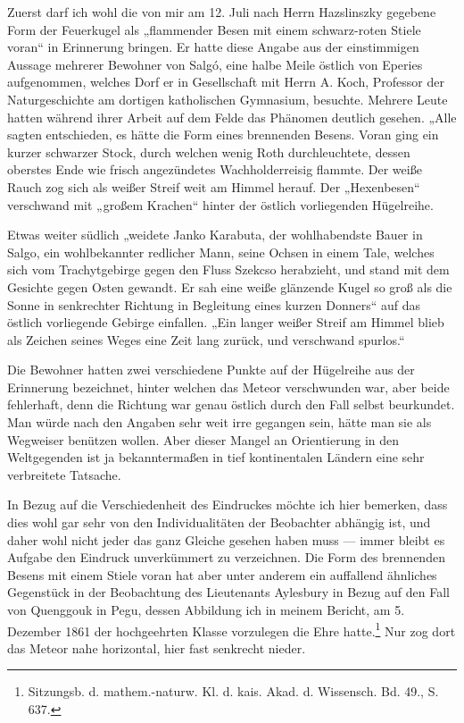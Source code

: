 \documentclass[a4paper, 11pt, oneside, german]{article}
\begin{document}
Zuerst darf ich wohl die von mir am 12. Juli nach Herrn Hazslinszky gegebene Form der Feuerkugel als „flammender Besen mit einem schwarz-roten Stiele voran“ in Erinnerung bringen. Er hatte diese Angabe aus der einstimmigen Aussage mehrerer Bewohner von Salgó, eine halbe Meile östlich von Eperies aufgenommen, welches Dorf er in Gesellschaft mit Herrn A. Koch, Professor der Naturgeschichte am dortigen katholischen Gymnasium, besuchte. Mehrere Leute hatten während ihrer Arbeit auf dem Felde das Phänomen deutlich gesehen. „Alle sagten entschieden, es hätte die Form eines brennenden Besens. Voran ging ein kurzer schwarzer Stock, durch welchen wenig Roth durchleuchtete, dessen oberstes Ende wie frisch angezündetes Wachholderreisig flammte. Der weiße Rauch zog sich als weißer Streif weit am Himmel herauf. Der „Hexenbesen“ verschwand mit „großem Krachen“ hinter der östlich vorliegenden Hügelreihe.

Etwas weiter südlich „weidete Janko Karabuta, der wohlhabendste Bauer in Salgo, ein wohlbekannter redlicher Mann, seine Ochsen in einem Tale, welches sich vom Trachytgebirge gegen den Fluss Szekcso herabzieht, und stand mit dem Gesichte gegen Osten gewandt. Er sah eine weiße glänzende Kugel so groß als die Sonne in senkrechter Richtung in Begleitung eines kurzen Donners“ auf das östlich vorliegende Gebirge einfallen. „Ein langer weißer Streif am Himmel blieb als Zeichen seines Weges eine Zeit lang zurück, und verschwand spurlos.“

Die Bewohner hatten zwei verschiedene Punkte auf der Hügelreihe aus der Erinnerung bezeichnet, hinter welchen das Meteor verschwunden war, aber beide fehlerhaft, denn die Richtung war genau östlich durch den Fall selbst beurkundet. Man würde nach den Angaben sehr weit irre gegangen sein, hätte man sie als Wegweiser benützen wollen. Aber dieser Mangel an Orientierung in den Weltgegenden ist ja bekanntermaßen in tief kontinentalen Ländern eine sehr verbreitete Tatsache.

In Bezug auf die Verschiedenheit des Eindruckes möchte ich hier bemerken, dass dies wohl gar sehr von den Individualitäten der Beobachter abhängig ist, und daher wohl nicht jeder das ganz Gleiche gesehen haben muss --- immer bleibt es Aufgabe den Eindruck unverkümmert zu verzeichnen. Die Form des brennenden Besens mit einem Stiele voran hat aber unter anderem ein auffallend ähnliches Gegenstück in der Beobachtung des Lieutenants Aylesbury in Bezug auf den Fall von Quenggouk in Pegu, dessen Abbildung ich in meinem Bericht, am 5. Dezember 1861 der hochgeehrten Klasse vorzulegen die Ehre hatte.\footnote{Sitzungsb. d. mathem.-naturw. Kl. d. kais. Akad. d. Wissensch. Bd. 49., S. 637.} Nur zog dort das Meteor nahe horizontal, hier fast senkrecht nieder.
\end{document}
